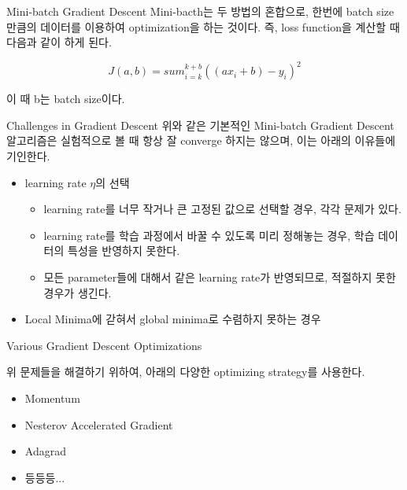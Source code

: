 \documentclass{beamer}
\begin{document}
\begin{frame}{Mini-batch Gradient Descent} 
Mini-bacth는 두 방법의 혼합으로, 한번에 batch size만큼의 데이터를 이용하여 optimization을 하는 것이다. 즉, loss function을 계산할 때 다음과 같이 하게 된다. 

\begin{equation} 
J(a,b) = sum_{i=k}^{k+b} ((ax_i + b) - y_i)^2 
\end{equation}

이 때 b는 batch size이다. 
\end{frame}


\begin{frame}{Challenges in Gradient Descent}
위와 같은 기본적인 Mini-batch Gradient Descent 알고리즘은 실험적으로 볼 때 항상 잘 converge 하지는 않으며, 이는 아래의 이유들에 기인한다. 

\begin{itemize} 
\item learning rate $\eta$의 선택 
\begin{itemize} 
\item learning rate를 너무 작거나 큰 고정된 값으로 선택할 경우, 각각 문제가 있다. 
\item learning rate를 학습 과정에서 바꿀 수 있도록 미리 정해놓는 경우, 학습 데이터의 특성을 반영하지 못한다. 
\item 모든 parameter들에 대해서 같은 learning rate가 반영되므로, 적절하지 못한 경우가 생긴다. 
\end{itemize}
\item Local Minima에 갇혀서 global minima로 수렴하지 못하는 경우 
\end{itemize}
\end{frame}

\begin{frame}{Various Gradient Descent Optimizations }

위 문제들을 해결하기 위하여, 아래의 다양한 optimizing strategy를 사용한다. 

\begin{itemize} 
\item Momentum 
\item Nesterov Accelerated Gradient 
\item Adagrad 
\item 등등등... 
\end{itemize}


\end{frame}
\end{document}
